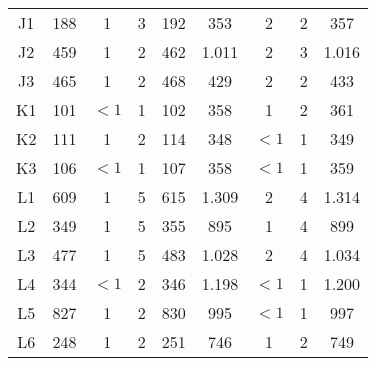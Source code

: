 \begin{center}
\begin{longtable}{ccccc|cccc}
    J1    & 188   & 1     & 3     & 192   & 353   & 2     & 2     & 357 \\
    J2    & 459   & 1     & 2     & 462   & 1.011 & 2     & 3     & 1.016 \\
    J3    & 465   & 1     & 2     & 468   & 429   & 2     & 2     & 433 \\
    K1    & 101   & $<1$     & 1     & 102   & 358   & 1     & 2     & 361 \\
    K2    & 111   & 1     & 2     & 114   & 348   & $<1$     & 1     & 349 \\
    K3    & 106   & $<1$     & 1     & 107   & 358   & $<1$     & 1     & 359 \\
    L1    & 609   & 1     & 5     & 615   & 1.309 & 2     & 4     & 1.314 \\
    L2    & 349   & 1     & 5     & 355   & 895   & 1     & 4     & 899 \\
    L3    & 477   & 1     & 5     & 483   & 1.028 & 2     & 4     & 1.034 \\
    L4    & 344   & $<1$     & 2     & 346   & 1.198 & $<1$     & 1     & 1.200 \\
    L5    & 827   & 1     & 2     & 830   & 995   & $<1$     & 1     & 997 \\
    L6    & 248   & 1     & 2     & 251   & 746   & 1     & 2     & 749 \\

\end{longtable}
\end{center}

